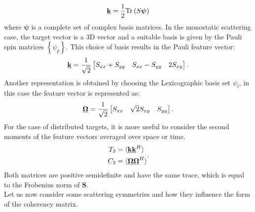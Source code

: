 \documentclass[11pt]{article}
\begin{document}
\begin{equation}
	\mathbf{\underline{k}} = \frac{1}{2}\mathrm{Tr}\left(S\boldsymbol\psi\right)
\end{equation}
where $\boldsymbol\psi$ is a complete set of complex basis matrices. In the monostatic scattering case, the target vector is a 3D vector and a suitable basis is given by the Pauli spin matrices $\left\{\psi_{p}\right\}$. This choice of basis results in the Pauli feature vector:
\begin{equation}
	\mathbf{\underline{k}} = \frac{1}{\sqrt{2}}
	\begin{bmatrix}
		S_{xx} + S_{yy} & S_{xx} - S_{yy} & 2 S_{xy}
	\end{bmatrix}.
\end{equation}
Another representation is obtained by choosing the Lexicographic basis set $\psi_{l}$, in this case the  feature vector is represented as:
\begin{equation}
	\mathbf{\underline{\Omega}} = \frac{1}{\sqrt{2}}
	\begin{bmatrix}
		S_{xx} & \sqrt{2} S_{xy} & S_{yy}
	\end{bmatrix}.
\end{equation}
For the case of distributed targets, it is more useful to consider the second moments of the feature vectors averaged over space or time. 
\begin{equation}
	\begin{split}
		T_{3} &= \langle\mathbf{\underline{k}}\mathbf{\underline{k}}^{H}\rangle\\
		C_{3} &= \langle\mathbf{\underline{\Omega}}\mathbf{\underline{\Omega}}^{H}\rangle
	\end{split}.
\end{equation}
Both matrices are positive semidefinite and have the same trace, which is equal to the Frobenius norm of $\mathbf{S}$.\\
Let us now consider some scattering symmetries and how they influence the form of the coherency matrix.
\end{document}
